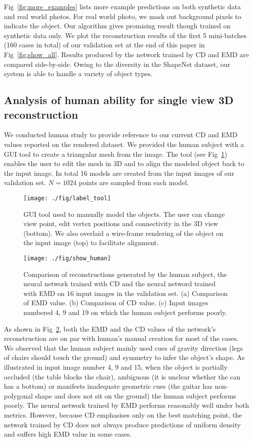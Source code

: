 \documentclass[10pt,twocolumn,letterpaper]{article}
\begin{document}
Fig~\ref{fig:more_examples} lists more example predictions on both synthetic data and real world photos. For real world photo, we mask out background pixels to indicate the object. Our algorithm gives promising result though trained on synthetic data only.
We plot the reconstruction results of the first 5 mini-batches (160 cases in total) of our validation set at the end of this paper in Fig~\ref{fig:show_all}. Results produced by the network trained by CD and EMD are compared side-by-side. Owing to the diversity in the ShapeNet dataset, our system is able to handle a variety of object types.

\subsection{Analysis of human ability for single view 3D reconstruction}
We conducted human study to provide reference to our current CD and EMD values reported on the rendered dataset. We provided the human subject with a GUI tool to create a triangular mesh from the image. The tool (see Fig~\ref{fig:gui_tool}) enables the user to edit the mesh in 3D and to align the modeled object back to the input image. In total 16 models are created from the input images of our validation set. $N=1024$ points are sampled from each model.

\begin{figure}
\centering
\texttt{[image: ./fig/label\_tool]}
\caption{GUI tool used to manually model the objects. The user can change view point, edit vertex positions and connectivity in the 3D view (bottom). We also overlaid a wire-frame rendering of the object on the input image (top) to facilitate alignment.}
\label{fig:gui_tool}
\end{figure}\begin{figure}
\centering
\texttt{[image: ./fig/show\_human]}
\caption{Comparison of reconstructions generated by the human subject, the neural network trained with CD and the neural netword trained with EMD on 16 input images in the validation set. (a) Comparison of EMD value. (b) Comparison of CD value. (c) Input images numbered 4, 9 and 19 on which the human subject performs poorly.}
\label{fig:human_number}
\end{figure}

As shown in Fig~\ref{fig:human_number}, both the EMD and the CD values of the network's reconstruction are on par with human's manual creation for most of the cases. We observed that the human subject mainly used cues of gravity direction (legs of chairs should touch the ground) and symmetry to infer the object's shape. As illustrated in input image number 4, 9 and 15, when the object is partially occluded (the table blocks the chair), ambiguous (it is unclear whether the can has a bottom) or manifests inadequate geometric cues (the guitar has non-polygonal shape and does not sit on the ground) the human subject performs poorly. The neural network trained by EMD performs reasonably well under both metrics. However, because CD emphasises only on the best matching point, the network trained by CD does not always produce predictions of uniform density and suffers high EMD value in some cases.
\end{document}
